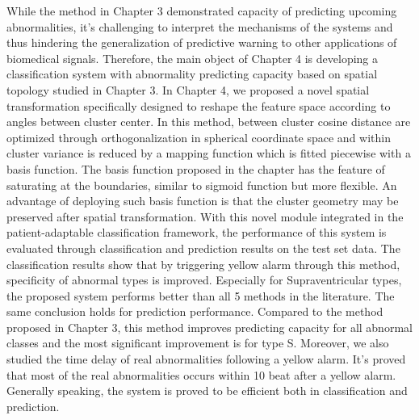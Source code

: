 While the method in Chapter 3 demonstrated capacity of predicting upcoming abnormalities, it's challenging to interpret the mechanisms of the systems and thus hindering the generalization of predictive warning to other applications of biomedical signals. Therefore, the main object of Chapter 4 is developing a classification system with abnormality predicting capacity based on spatial topology studied in Chapter 3. In Chapter 4, we proposed a novel spatial transformation specifically designed to reshape the feature space according to angles between cluster center. In this method, between cluster cosine distance are optimized through orthogonalization in spherical coordinate space and within cluster variance is reduced by a mapping function which is fitted piecewise with a basis function. The basis function proposed in the chapter has the feature of saturating at the boundaries, similar to sigmoid function but more flexible. An advantage of deploying such basis function is that the cluster geometry may be preserved after spatial transformation. With this novel module integrated in the patient-adaptable classification framework, the performance of this system is evaluated through classification and prediction results on the test set data. The classification results show that by triggering yellow alarm through this method, specificity of abnormal types is improved. Especially for Supraventricular types, the proposed system performs better than all 5 methods in the literature. The same conclusion holds for prediction performance. Compared to the method proposed in Chapter 3, this method improves predicting capacity for all abnormal classes and the most significant improvement is for type S. Moreover, we also studied the time delay of real abnormalities following a yellow alarm. It's proved that most of the real abnormalities occurs within 10 beat after a yellow alarm. Generally speaking, the system is proved to be efficient both in classification and prediction.



